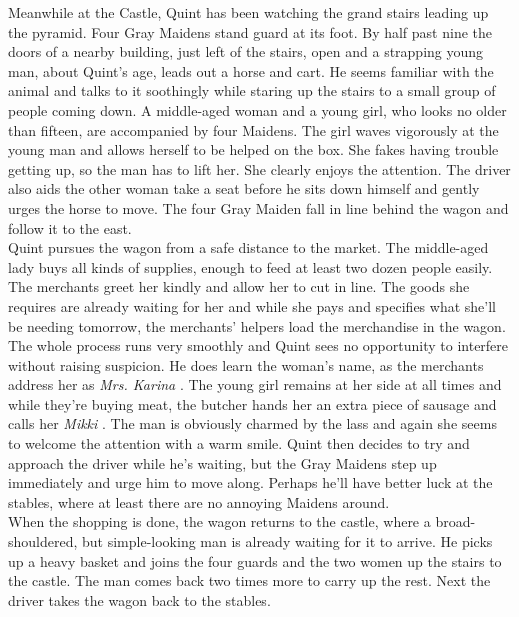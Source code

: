 Meanwhile at the Castle, Quint has been watching the grand stairs leading up the pyramid. Four Gray Maidens stand guard at its foot. By half past nine the doors of a nearby building, just left of the stairs, open and a strapping young man, about Quint's age, leads out a horse and cart. He seems familiar with the animal and talks to it soothingly while staring up the stairs to a small group of people coming down. A middle-aged woman and a young girl, who looks no older than fifteen, are accompanied by four Maidens. The girl waves vigorously at the young man and allows herself to be helped on the box. She fakes having trouble getting up, so the man has to lift her. She clearly enjoys the attention. The driver also aids the other woman take a seat before he sits down himself and gently urges the horse to move. The four Gray Maiden fall in line behind the wagon and follow it to the east.\\

Quint pursues the wagon from a safe distance to the market. The middle-aged lady buys all kinds of supplies, enough to feed at least  two dozen people easily. The merchants greet her kindly and allow her to cut in line. The goods she requires are already waiting for her and while she pays and specifies what she'll be needing tomorrow, the merchants' helpers load the merchandise in the wagon. The whole process runs very smoothly and Quint sees no opportunity to interfere without raising suspicion. He does learn the woman's name, as the merchants address her as {\itshape Mrs. Karina} . The young girl remains at her side at all times and while they're buying meat, the butcher hands her an extra piece of sausage and calls her  {\itshape Mikki} . The man is obviously charmed by the lass and again she seems to welcome the attention with a warm smile. Quint then decides to try and approach the driver while he's waiting, but the Gray Maidens step up immediately and urge him to move along. Perhaps he'll have better luck at the stables, where at least there are no annoying Maidens around.\\

When the shopping is done, the wagon returns to the castle, where a broad-shouldered, but simple-looking man is already waiting for it to arrive. He picks up a heavy basket and joins the four guards and the two women up the stairs to the castle. The man comes back two times more to carry up the rest. Next the driver takes the wagon back to the stables.\\

